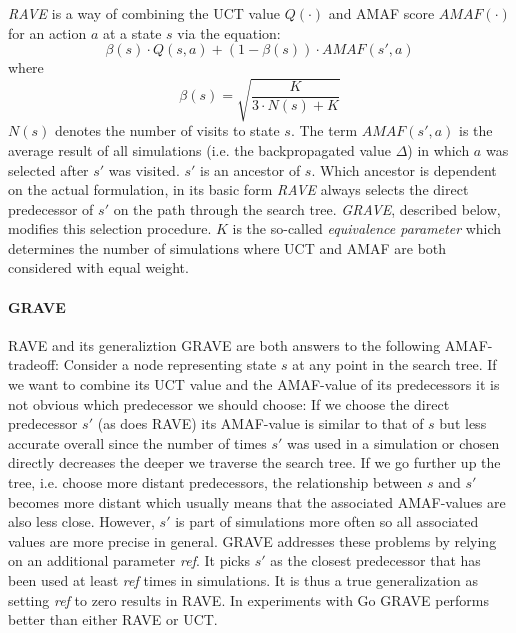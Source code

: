 \textit{RAVE} is a way of combining the UCT value $Q(\cdot)$ and AMAF score $AMAF(\cdot)$ for an action $a$ at a state $s$ via the equation:
\begin{equation}
    \beta(s) \cdot Q(s,a) + (1 - \beta(s)) \cdot AMAF(s',a)
    \label{eq:rave}
\end{equation}
where 
\begin{equation*}
    \beta(s) = \sqrt{\frac{K}{3 \cdot N(s) + K}}
\end{equation*}
$N(s)$ denotes the number of visits to state $s$. The term $AMAF(s',a)$ is the average result of all simulations (i.e. the backpropagated value $\Delta$) in which $a$ was selected after $s'$ was visited. $s'$ is an ancestor of $s$. Which ancestor is dependent on the actual formulation, in its basic form \textit{RAVE} always selects the direct predecessor of $s'$ on the path through the search tree. \textit{GRAVE}, described below, modifies this selection procedure. $K$ is the so-called \textit{equivalence parameter} which determines the number of simulations where UCT and AMAF are both considered with equal weight.
\paragraph{GRAVE}
RAVE and its generaliztion GRAVE \cite{cazenave2015generalized} are both answers to the following AMAF-tradeoff: Consider a node representing state $s$ at any point in the search tree. If we want to combine its UCT value and the AMAF-value of its predecessors it is not obvious which predecessor we should choose: If we choose the direct predecessor $s'$ (as does RAVE) its AMAF-value is similar to that of $s$ but less accurate overall since the number of times $s'$ was used in a simulation or chosen directly decreases the deeper we traverse the search tree. If we go further up the tree, i.e. choose more distant predecessors, the relationship between $s$ and $s'$ becomes more distant which usually means that the associated AMAF-values are also less close. However, $s'$ is part of simulations more often so all associated values are more precise in general. GRAVE addresses these problems by relying on an additional parameter \textit{ref}. It picks $s'$ as the closest predecessor that has been used at least \textit{ref} times in simulations. It is thus a true generalization as setting \textit{ref} to zero results in RAVE. In experiments with Go GRAVE performs better than either RAVE or UCT.
